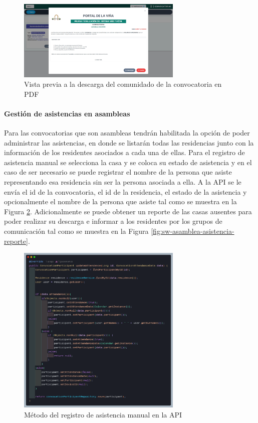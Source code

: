 \begin{figure}[H]
    \centering
    \includegraphics[width=0.7\textwidth]{resources/images/sw-convocatorias-comunicado}
    \caption{Vista previa a la descarga del comunidado de la convocatoria en PDF}
    \label{fig:sw-convocatorias-comunicado}
\end{figure}

\paragraph{Gestión de asistencias en asambleas}

Para las convocatorias que son asambleas tendrán habilitada la opción de poder administrar las asistencias, en donde se listarán todas las residencias junto con la información de los residentes asociados a cada una de ellas.
Para el registro de asistencia manual se selecciona la casa y se coloca su estado de asistencia y en el caso de ser necesario se puede registrar el nombre de la persona que asiste representando esa residencia sin ser la persona asociada a ella.
A la API se le envía el id de la convocatoria, el id de la residencia, el estado de la asistencia y opcionalmente el nombre de la persona que asiste tal como se muestra en la Figura \ref{fig:api-attendance-create}.
Adicionalmente se puede obtener un reporte de las casas ausentes para poder realizar su descarga e informar a los residentes por los grupos de comunicación tal como se muestra en la Figura \ref{fig:sw-asamblea-asistencia-reporte}.

\begin{figure}[H]
    \centering
    \includegraphics[width=0.7\textwidth]{resources/images/api-asamblea-asistencia-manual}
    \caption{Método del registro de asistencia manual en la API}
    \label{fig:api-attendance-create}
\end{figure}

